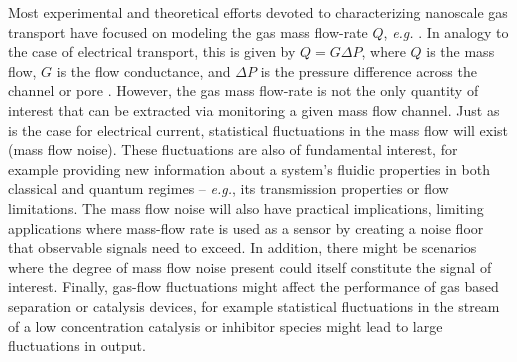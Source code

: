 \documentclass[%
 reprint,
 aps,
 prb,
 epsf,
]{revtex4-2}
\begin{document}
    Most experimental and theoretical efforts devoted to characterizing nanoscale gas transport have focused on modeling the gas mass flow-rate $Q$,  {\it e.g.} \cite{scorrano,shen}.  In analogy to the case of electrical transport, this is given by $Q = G\Delta P$, where $Q$ is the mass flow, $G$ is the flow conductance, and $\Delta P$ is the pressure difference across the channel or pore \cite{savard}.   However, the gas mass flow-rate is not the only quantity of interest that can be extracted via monitoring a given mass flow channel.  Just as is the case for electrical current, statistical fluctuations in the mass flow will exist (mass flow noise).  These fluctuations are also of fundamental interest, for example providing new information about a system's fluidic properties in both classical and quantum regimes -- {\it e.g.}, its transmission properties or flow limitations.  The mass flow noise will also have practical implications, limiting applications where mass-flow rate is used as a sensor by creating a noise floor that observable signals need to exceed.   In addition, there might be scenarios where the degree of mass flow noise present could itself constitute the signal of interest.   Finally, gas-flow fluctuations might affect the performance of gas based separation or catalysis devices, for example statistical fluctuations in the stream of a low concentration catalysis or inhibitor species might lead to large fluctuations in output.\\
    
\end{document}
